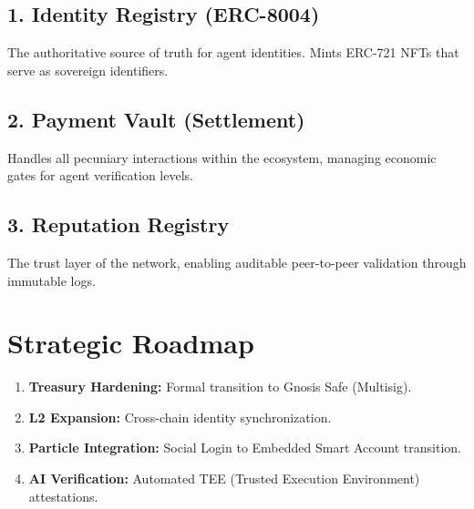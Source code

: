 \documentclass[11pt,a4paper]{article}
\begin{document}
\subsection{1. Identity Registry (ERC-8004)}
The authoritative source of truth for agent identities. Mints ERC-721 NFTs that serve as sovereign identifiers.

\subsection{2. Payment Vault (Settlement)}
Handles all pecuniary interactions within the ecosystem, managing economic gates for agent verification levels.

\subsection{3. Reputation Registry}
The trust layer of the network, enabling auditable peer-to-peer validation through immutable logs.

\section{Strategic Roadmap}
\begin{enumerate}
    \item \textbf{Treasury Hardening:} Formal transition to Gnosis Safe (Multisig).
    \item \textbf{L2 Expansion:} Cross-chain identity synchronization.
    \item \textbf{Particle Integration:} Social Login to Embedded Smart Account transition.
    \item \textbf{AI Verification:} Automated TEE (Trusted Execution Environment) attestations.
\end{enumerate}
\end{document}
